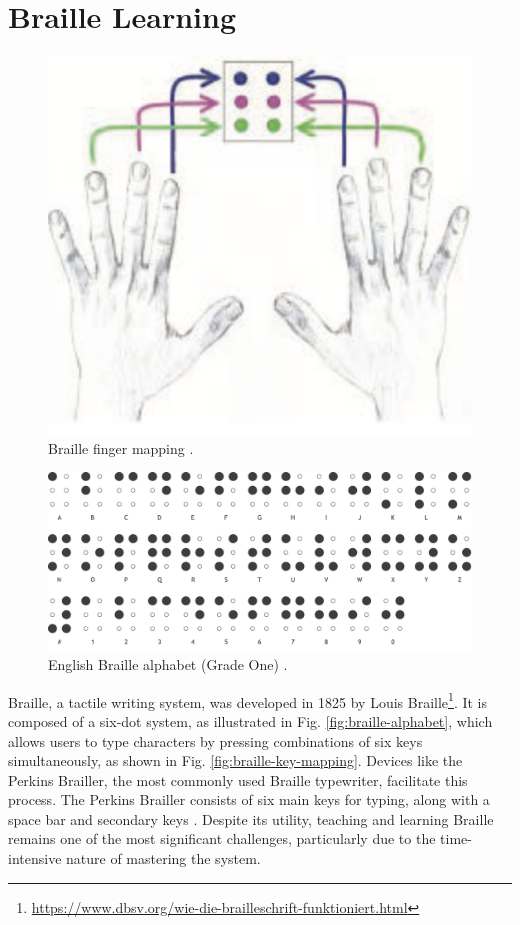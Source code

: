 \section{Braille Learning}
\begin{figure}
    \centering
    \includegraphics[width=0.5\linewidth]{src//pictures/Screenshot 2024-09-12 at 20.13.38.png}
    \caption{Braille finger mapping \cite{Seim2014a}.}
    \label{fig:braille-key-mapping}
\end{figure}
\begin{figure}
    \centering
    \includegraphics[width=0.5\linewidth]{src//pictures/braille_alphabet.png}
    \caption{English Braille alphabet (Grade One) \cite{pharmabrailleBrailleAlphabet,troughton1992guidelines}.}
    \label{fig:braille-alphabet}
\end{figure}
Braille, a tactile writing system, was developed in 1825 by Louis Braille\footnote{\url{https://www.dbsv.org/wie-die-brailleschrift-funktioniert.html}}. It is composed of a six-dot system, as illustrated in Fig. \autoref{fig:braille-alphabet}, which allows users to type characters by pressing combinations of six keys simultaneously, as shown in Fig. \autoref{fig:braille-key-mapping}. Devices like the Perkins Brailler, the most commonly used Braille typewriter, facilitate this process. The Perkins Brailler consists of six main keys for typing, along with a space bar and secondary keys \cite{Wikipedia2023}. Despite its utility, teaching and learning Braille remains one of the most significant challenges, particularly due to the time-intensive nature of mastering the system.

